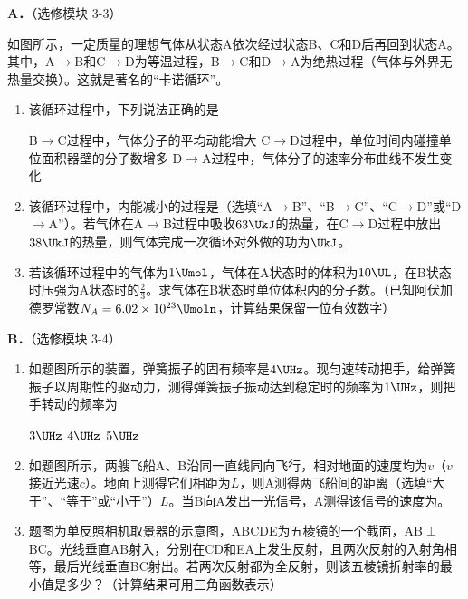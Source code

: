 \documentclass[\gkver]{gaokaozhenti}
\begin{document}
\begin{enumerate}
\textbf{A．}（选修模块 3-3）

如图所示，一定质量的理想气体从状态A依次经过状态B、C和D后再回到状态A。其中，A$\to$B和C$\to$D为等温过程，B$\to$C和D$\to$A为绝热过程（气体与外界无热量交换）。这就是著名的“卡诺循环”。


\begin{enumerate}
	\item
	该循环过程中，下列说法正确的是

	{B$\to$C过程中，气体分子的平均动能增大}
	{C$\to$D过程中，单位时间内碰撞单位面积器壁的分子数增多}
	{D$\to$A过程中，气体分子的速率分布曲线不发生变化}
	\item
	该循环过程中，内能减小的过程是（选填“A$\to$B”、“B$\to$C”、“C$\to$D”或“D$\to$A”）。若气体在A$\to$B过程中吸收$63\UkJ$的热量，在C$\to$D过程中放出$38\UkJ$的热量，则气体完成一次循环对外做的功为$\UkJ$。
	\item
	若该循环过程中的气体为$1\Umol$，气体在A状态时的体积为$10\UL$，在B状态时压强为A状态时的$\frac{2}{3}$。求气体在B状态时单位体积内的分子数。（已知阿伏加德罗常数$N_{A}=6.02\times10^{23}\Umoln$，计算结果保留一位有效数字）
\end{enumerate}

\textbf{B．}（选修模块 3-4）

\begin{enumerate}
	\item
	如题图所示的装置，弹簧振子的固有频率是$4\UHz$。现匀速转动把手，给弹簧振子以周期性的驱动力，测得弹簧振子振动达到稳定时的频率为$1\UHz$，则把手转动的频率为


	\fourchoices[answer=A]
	{$1\UHz$}
	{$3\UHz$}
	{$4\UHz$}
	{$5\UHz$}
	\item
	如题图所示，两艘飞船A、B沿同一直线同向飞行，相对地面的速度均为$v$（$v$接近光速$c$）。地面上测得它们相距为$L$，则A测得两飞船间的距离（选填“大于”、“等于”或“小于”）$L$。当B向A发出一光信号，A测得该信号的速度为。

	\onepicture[align=right, w=5.00cm]{}
	\item
	题图为单反照相机取景器的示意图，ABCDE为五棱镜的一个截面，AB$\perp$BC。光线垂直AB射入，分别在CD和EA上发生反射，且两次反射的入射角相等，最后光线垂直BC射出。若两次反射都为全反射，则该五棱镜折射率的最小值是多少？（计算结果可用三角函数表示）


\end{enumerate}
\end{enumerate}
\end{document}
